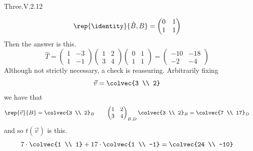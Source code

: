 \begin{ans}{Three.V.2.12}
\begin{exparts}
\begin{equation*}
            \rep{\identity}{\hat{B},B}=\begin{pmatrix}
              0  &1  \\
              1  &1
            \end{pmatrix}
          \end{equation*}
          Then the answer is this.
          \begin{equation*}
            \hat{T}=
            \begin{pmatrix}
              1  &-3  \\
              1  &-1
            \end{pmatrix}
            \begin{pmatrix}
              1  &2  \\
              3  &4
            \end{pmatrix}
            \begin{pmatrix}
              0  &1  \\
              1  &1
            \end{pmatrix}
            =\begin{pmatrix}
              -10  &-18  \\
              -2   &-4
            \end{pmatrix}
          \end{equation*}
          Although not strictly necessary, a check is reassuring.
          Arbitrarily fixing
          \begin{equation*}
            \vec{v}=\colvec{3 \\ 2}
          \end{equation*}
          we have that
          \begin{equation*}
            \rep{\vec{v}}{B}=\colvec{3 \\ 2}_B
            \qquad
            \begin{pmatrix}
              1  &2  \\
              3  &4
            \end{pmatrix}_{B,D}
            \colvec{3 \\ 2}_B
            =\colvec{7 \\ 17}_D
          \end{equation*}
          and so $t(\vec{v})$ is this.
          \begin{equation*}
            7\cdot\colvec{1 \\ 1}+17\cdot\colvec{1 \\ -1}=\colvec{24 \\ -10}

\end{equation*}
\end{exparts}
\end{ans}
